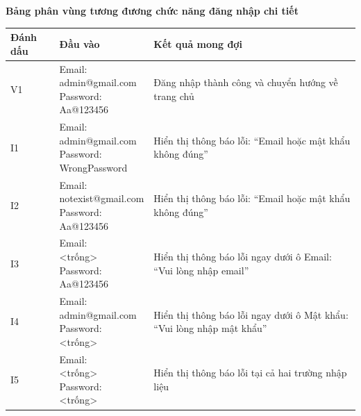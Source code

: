 \textbf{Bảng phân vùng tương đương chức năng đăng nhập chi tiết}
\begin{table}[H]
	\centering
	\footnotesize
	\renewcommand{\arraystretch}{1.25}
	\setlength{\tabcolsep}{4pt}
	\begin{tabularx}{\textwidth}{|>{\centering\arraybackslash}p{1.6cm}|>{\raggedright\arraybackslash}p{3.8cm}|>{\raggedright\arraybackslash}X|}
		\hline
		\textbf{Đánh dấu} & \textbf{Đầu vào}       & \textbf{Kết quả mong đợi} \\
		\hline
		V1                & \makecell[l]{Email:                                \\admin@gmail.com\\Password:\\Aa@123456} & Đăng nhập thành công và chuyển hướng về trang chủ \\
		\hline
		I1                & \makecell[l]{Email:                                \\admin@gmail.com\\Password:\\WrongPassword} & Hiển thị thông báo lỗi: ``Email hoặc mật khẩu không đúng'' \\
		\hline
		I2                & \makecell[l]{Email:                                \\notexist@gmail.com\\Password:\\Aa@123456} & Hiển thị thông báo lỗi: ``Email hoặc mật khẩu không đúng'' \\
		\hline
		I3                & \makecell[l]{Email:                                \\<trống>\\Password:\\Aa@123456} & Hiển thị thông báo lỗi ngay dưới ô Email: ``Vui lòng nhập email'' \\
		\hline
		I4                & \makecell[l]{Email:                                \\admin@gmail.com\\Password:\\<trống>} & Hiển thị thông báo lỗi ngay dưới ô Mật khẩu: ``Vui lòng nhập mật khẩu'' \\
		\hline
		I5                & \makecell[l]{Email:                                \\<trống>\\Password:\\<trống>} & Hiển thị thông báo lỗi tại cả hai trường nhập liệu \\
		\hline

\end{tabularx}
\end{table}
